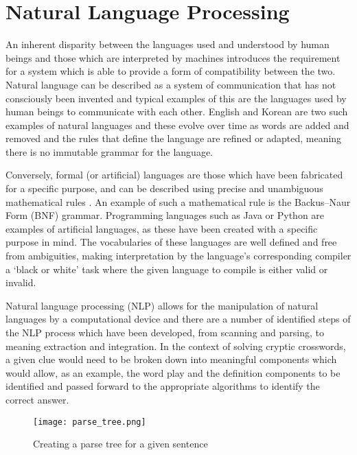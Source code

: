 \section{Natural Language Processing}

An inherent disparity between the languages used and understood by human beings
and those which are interpreted by machines introduces the requirement for a
system which is able to provide a form of compatibility between the two. Natural
language can be described as  a system of communication that has not consciously
been invented \citep{collins04} and typical examples of this are the languages
used by human beings to communicate with each other. English and Korean are two
such examples of natural languages and these evolve over time as words are added
and removed and the rules that define the language are refined or adapted,
meaning there is no immutable grammar for the language.

Conversely, formal (or artificial) languages are those which have been
fabricated for a specific purpose, and can be described using precise and
unambiguous mathematical rules \citep{jiang10}. An example of such a
mathematical rule is the Backus–Naur Form (BNF) grammar. Programming languages
such as Java or Python are examples of artificial languages, as these have been
created with a specific purpose in mind. The vocabularies of these languages are
well defined and free from ambiguities, making interpretation by the language’s
corresponding compiler a ‘black or white’ task where the given language to
compile is either valid or invalid.

Natural language processing (NLP) allows for the manipulation of natural
languages by a computational device \citep{bird09} and there are a number of
identified steps of the NLP process which have been developed, from scanning and
parsing, to meaning extraction and integration. In the context of solving
cryptic crosswords, a given clue would need to be broken down into meaningful
components which would allow, as an example, the word play and the definition
components to be identified and passed forward to the appropriate algorithms to
identify the correct answer.

\begin{figure}[H]
	\centering
	\texttt{[image: parse\_tree.png]}
	\caption{Creating a parse tree for a given sentence}
\end{figure}

\begin{flushright}
	\citep{halpern13}
\end{flushright}

